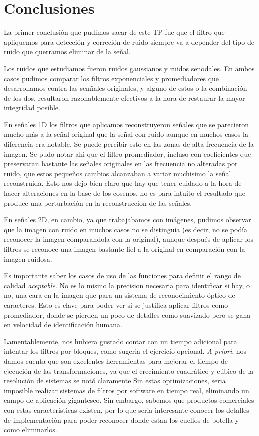 \section{Conclusiones}

La primer conclusi\'on que pudimos sacar de este TP fue que el filtro que apliquemos para detecci\'on y correci\'on
de ruido siempre va a depender del tipo de ruido que querramos eliminar de la se\~nal.

Los ruidos que estudiamos fueron ruidos gaussianos y ruidos senodales. En ambos casos pudimos comparar los filtros
exponenciales y promediadores que desarrollamos contra las sen\~nales originales, y alguno de estos o la combinaci\'on de los dos,
resultaron razonablemente efectivos a la hora de restaurar la mayor integridad posible.

En se\~nales 1D los filtros que aplicamos reconstruyeron se\~nales que se parecieron mucho m\'as a la se\~nal
original que la se\~nal con ruido aunque en muchos casos la diferencia era notable. Se puede percibir esto en las zonas
de alta frecuencia de la imagen. Se pudo notar ahi que el filtro promediador, incluso con coeficientes que preservaran
bastante las se\~nales originales en las frecuencia no alteradas por ruido, que estos peque\~nos cambios alcanzaban a
variar muchisimo la se\~nal reconstruida. Esto nos dejo bien claro que hay que tener cuidado a la hora de hacer alteraciones
en la base de los cosenos, no es para intuito el resultado que produce una perturbaci\'on en la reconstruccion de las se\~nales.

En se\~nales 2D, en cambio, ya que trabajabamos con im\'agenes, pudimos observar que la imagen con ruido en muchos
casos no se distingu\'ia (es decir, no se pod\'ia reconocer la imagen comparandola con la original), aunque despu\'es
de aplicar los filtros se reconoce una imagen bastante fiel a la original en comparaci\'on con la imagen ruidosa.

Es importante saber los casos de uso de las funciones para definir el rango de calidad \textit{aceptable}. No es lo mismo
la precision necesaria para identificar si hay, o no, una cara en la imagen que para un sistema de reconocimiento \'optico
de caracteres. Esto es clave para poder ver si se justifica aplicar filtros como promediador, donde se pierden un poco de detalles como suavizado
pero se gana en velocidad de identificaci\'on humana.

Lamentablemente, nos hubiera gustado contar con un tiempo adicional para intentar los filtros por bloques, como sugeria el ejercicio
opcional. \textit{A priori}, nos damos cuenta que son excelentes herramientas para mejorar el tiempo de ejecuci\'on
de las transformaciones, ya que el crecimiento cuadr\'atico y c\'ubico de la resoluci\'on de sistemas se not\'o claramente
Sin estas optimizaciones, seria imposible realizar sistemas de filtros por software en tiempo real, eliminando un campo de 
aplicaci\'on gigantesco. Sin embargo, sabemos que productos comerciales con estas caracteristicas existen, por lo que
seria interesante conocer los detalles de implementaci\'on para poder reconocer donde estan los cuellos de botella y como
eliminarlos.

